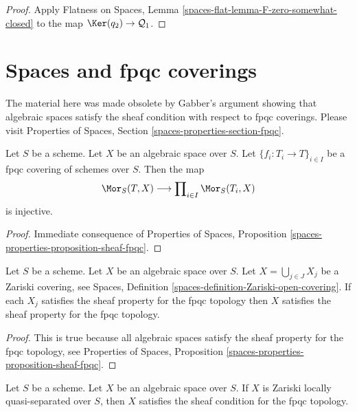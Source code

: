 \begin{proof}
Apply Flatness on Spaces, Lemma \ref{spaces-flat-lemma-F-zero-somewhat-closed}
to the map $\Ker(q_2) \to \mathcal{Q}_1$.
\end{proof}







\section{Spaces and fpqc coverings}
\label{section-fpqc}

\noindent
The material here was made obsolete by Gabber's argument showing that
algebraic spaces satisfy the sheaf condition with respect to fpqc
coverings. Please visit
Properties of Spaces, Section \ref{spaces-properties-section-fpqc}.

\begin{lemma}
\label{lemma-separated-fpqc}
Let $S$ be a scheme. Let $X$ be an algebraic space over $S$.
Let $\{f_i : T_i \to T\}_{i \in I}$ be a fpqc covering of schemes over $S$.
Then the map
$$
\Mor_S(T, X)
\longrightarrow
\prod\nolimits_{i \in I} \Mor_S(T_i, X)
$$
is injective.
\end{lemma}

\begin{proof}
Immediate consequence of
Properties of Spaces, Proposition
\ref{spaces-properties-proposition-sheaf-fpqc}.
\end{proof}

\begin{lemma}
\label{lemma-sheaf-fpqc-open-covering}
Let $S$ be a scheme. Let $X$ be an algebraic space over $S$.
Let $X = \bigcup_{j \in J} X_j$ be a Zariski covering, see
Spaces, Definition \ref{spaces-definition-Zariski-open-covering}.
If each $X_j$ satisfies the sheaf property for the fpqc topology
then $X$ satisfies the sheaf property for the fpqc topology.
\end{lemma}

\begin{proof}
This is true because all algebraic spaces satisfy the sheaf property
for the fpqc topology, see
Properties of Spaces, Proposition
\ref{spaces-properties-proposition-sheaf-fpqc}.
\end{proof}

\begin{lemma}
\label{lemma-sheaf-fpqc-quasi-separated}
Let $S$ be a scheme. Let $X$ be an algebraic space over $S$.
If $X$ is Zariski locally quasi-separated over $S$, then $X$ satisfies
the sheaf condition for the fpqc topology.
\end{lemma}

